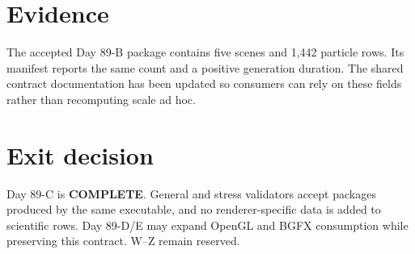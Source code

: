 \documentclass[11pt]{article}
\begin{document}
\section{Evidence}
The accepted Day 89-B package contains five scenes and 1,442 particle rows. Its manifest reports the same count and a positive generation duration. The shared contract documentation has been updated so consumers can rely on these fields rather than recomputing scale ad hoc.

\section{Exit decision}
Day 89-C is \textbf{COMPLETE}. General and stress validators accept packages produced by the same executable, and no renderer-specific data is added to scientific rows. Day 89-D/E may expand OpenGL and BGFX consumption while preserving this contract. W--Z remain reserved.
\end{document}
